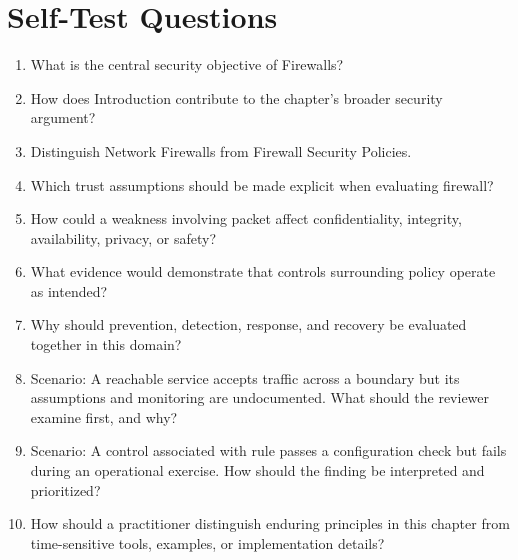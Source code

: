\documentclass[11pt]{article}
\begin{document}
\section*{Self-Test Questions}
\begin{enumerate}
\item What is the central security objective of Firewalls?
\item How does Introduction contribute to the chapter's broader security argument?
\item Distinguish Network Firewalls from Firewall Security Policies.
\item Which trust assumptions should be made explicit when evaluating firewall?
\item How could a weakness involving packet affect confidentiality, integrity, availability, privacy, or safety?
\item What evidence would demonstrate that controls surrounding policy operate as intended?
\item Why should prevention, detection, response, and recovery be evaluated together in this domain?
\item Scenario: A reachable service accepts traffic across a boundary but its assumptions and monitoring are undocumented. What should the reviewer examine first, and why?
\item Scenario: A control associated with rule passes a configuration check but fails during an operational exercise. How should the finding be interpreted and prioritized?
\item How should a practitioner distinguish enduring principles in this chapter from time-sensitive tools, examples, or implementation details?
\end{enumerate}
\end{document}
